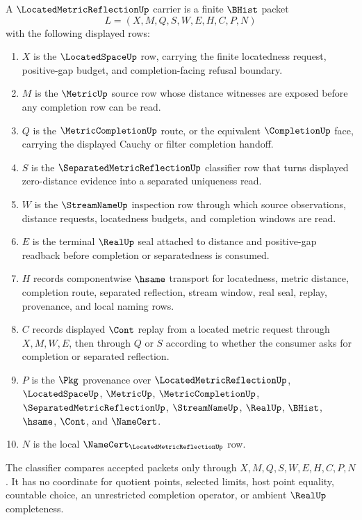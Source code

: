\begin{definition}
\label{def:located-metric-reflection-carrier}
A $\LocatedMetricReflectionUp$ carrier is a finite $\BHist$ packet
$$
L=(X,M,Q,S,W,E,H,C,P,N)
$$
with the following displayed rows:
\begin{enumerate}
\item $X$ is the $\LocatedSpaceUp$ row, carrying the finite locatedness request, positive-gap budget, and completion-facing refusal boundary.
\item $M$ is the $\MetricUp$ source row whose distance witnesses are exposed before any completion row can be read.
\item $Q$ is the $\MetricCompletionUp$ route, or the equivalent $\CompletionUp$ face, carrying the displayed Cauchy or filter completion handoff.
\item $S$ is the $\SeparatedMetricReflectionUp$ classifier row that turns displayed zero-distance evidence into a separated uniqueness read.
\item $W$ is the $\StreamNameUp$ inspection row through which source observations, distance requests, locatedness budgets, and completion windows are read.
\item $E$ is the terminal $\RealUp$ seal attached to distance and positive-gap readback before completion or separatedness is consumed.
\item $H$ records componentwise $\hsame$ transport for locatedness, metric distance, completion route, separated reflection, stream window, real seal, replay, provenance, and local naming rows.
\item $C$ records displayed $\Cont$ replay from a located metric request through $X,M,W,E$, then through $Q$ or $S$ according to whether the consumer asks for completion or separated reflection.
\item $P$ is the $\Pkg$ provenance over $\LocatedMetricReflectionUp$, $\LocatedSpaceUp$, $\MetricUp$, $\MetricCompletionUp$, $\SeparatedMetricReflectionUp$, $\StreamNameUp$, $\RealUp$, $\BHist$, $\hsame$, $\Cont$, and $\NameCert$.
\item $N$ is the local $\NameCert_{\LocatedMetricReflectionUp}$ row.
\end{enumerate}
The classifier compares accepted packets only through $X,M,Q,S,W,E,H,C,P,N$. It has no coordinate for quotient points, selected limits, host point equality, countable choice, an unrestricted completion operator, or ambient $\RealUp$ completeness.
\end{definition}

